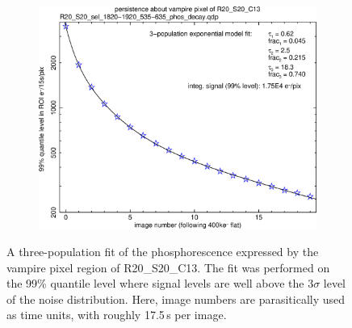\begin{figure}[!htbp]
\centering
\begin{subfigure}{0.8\textwidth}    
  \centering
  \includegraphics[width=\textwidth]{figures/phosphorescence-survey/phos_kinetics/R20_S20_sel_1820-1920_535-635_phos_decay_fit.png}    
\end{subfigure}
\caption{A three-population fit of the phosphorescence expressed by the vampire pixel region of R20\_S20\_C13. The fit was performed on the 99\% quantile level where signal levels are well above the $3\sigma$ level of the noise distribution. Here, image numbers are parasitically used as time units, with roughly 17.5\,s per image.}
\label{fig:phos:kinetics:fit:R20S20C13}
\end{figure}

